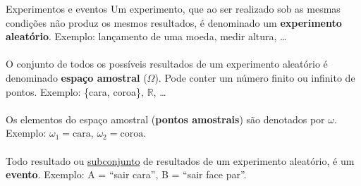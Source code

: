 \documentclass[10pt]{beamer}\usepackage[]{graphicx}\usepackage[]{color}
\theoremstyle{definition}
\begin{document}

\begin{frame}{Experimentos e eventos}
Um experimento, que ao ser realizado sob as mesmas condições não
 produz os mesmos resultados, é denominado um \textbf{experimento
   aleatório}. Exemplo: lançamento de uma moeda, medir altura, \ldots
 \\~\\
 O conjunto de todos os possíveis resultados de um experimento
 aleatório é denominado \textbf{espaço amostral} ($\Omega$). Pode conter
 um número finito ou infinito de pontos. Exemplo: \{cara, coroa\},
 $\mathbb{R}$, \ldots  \\~\\
 Os elementos do espaço amostral (\textbf{pontos amostrais}) são
 denotados por $\omega$. Exemplo: $\omega_1 = \text{cara}$, $\omega_2 =
 \text{coroa}$. \\~\\
 Todo resultado ou \underline{subconjunto} de resultados de um
 experimento aleatório, é um \textbf{evento}. Exemplo: A = ``sair
 cara'', B = ``sair face par''.
\end{frame}
\end{document}
